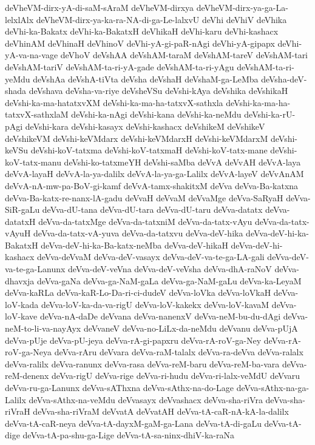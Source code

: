 {deVheVM-dirx-yA-di-saM-sAraM
deVheVM-dirxya
deVheVM-dirx-ya-ga-La-lelxlAlx
deVheVM-dirx-ya-ka-ra-NA-di-ga-Le-lalxvU
deVhi
deVhiV
deVhika
deVhi-ka-Bakatx
deVhi-ka-BakatxH
deVhikaH
deVhi-karu
deVhi-kashacx
deVhinAM
deVhinaH
deVhinoV
deVhi-yA-gi-paR-nAgi
deVhi-yA-gipapx
deVhi-yA-va-na-vage
deVhoV
deVshAA
deVshAM-taraM
deVshAM-tareV
deVshAM-tari
deVshAM-tariV
deVshAM-ta-ri-yA-gade
deVshAM-ta-ri-yAgu
deVshAM-ta-ri-yeMdu
deVshAa
deVshA-tiVta
deVsha
deVshaH
deVshaM-ga-LeMba
deVsha-deV-shada
deVshava
deVsha-va-riye
deVsheVSu
deVshi-kAya
deVshika
deVshikaH
deVshi-ka-ma-hatatxvXM
deVshi-ka-ma-ha-tatxvX-sathxla
deVshi-ka-ma-ha-tatxvX-sathxlaM
deVshi-ka-nAgi
deVshi-kana
deVshi-ka-neMdu
deVshi-ka-rU-pAgi
deVshi-kara
deVshi-kasayx
deVshi-kashacx
deVshikeM
deVshikeV
deVshikeVM
deVshi-keVMdarx
deVshi-keVMdarxH
deVshi-keVMdarxM
deVshi-keVSu
deVshi-koV-tatxma
deVshi-koV-tatxmaH
deVshi-koV-tatx-mane
deVshi-koV-tatx-manu
deVshi-ko-tatxmeYH
deVshi-saMba
deVvA
deVvAH
deVvA-laya
deVvA-layaH
deVvA-la-ya-dalilx
deVvA-la-ya-ga-Lalilx
deVvA-layeV
deVvAnAM
deVvA-nA-mw-pa-BoV-gi-kamf
deVvA-tamx-shakitxM
deVva
deVva-Ba-katxna
deVva-Ba-katx-re-nanx-lA-gadu
deVvaH
deVvaM
deVvaMge
deVva-SaRyaH
deVva-SiR-gaLu
deVva-dU-tana
deVva-dU-tara
deVva-dU-taru
deVva-datatx
deVva-datatxH
deVva-da-tatxMge
deVva-da-tatxniM
deVva-da-tatx-vAyu
deVva-da-tatx-vAyuH
deVva-da-tatx-vA-yuva
deVva-da-tatxvu
deVva-deV-hika
deVva-deV-hi-ka-BakatxH
deVva-deV-hi-ka-Ba-katx-neMba
deVva-deV-hikaH
deVva-deV-hi-kashacx
deVva-deVvaM
deVva-deV-vasayx
deVva-deV-va-te-ga-LA-gali
deVva-deV-va-te-ga-Lanunx
deVva-deV-veVna
deVva-deV-veVsha
deVva-dhA-raNoV
deVva-dhavxja
deVva-gaNa
deVva-ga-NaM-gaLa
deVva-ga-NaM-gaLu
deVva-ka-LeyaM
deVva-kaRLa
deVva-kaR-Lo-Da-ri-ci-dudeV
deVva-loVka
deVva-loVkaH
deVva-loV-kada
deVva-loV-ka-da-va-rigU
deVva-loV-kakekx
deVva-loV-kavaM
deVva-loV-kave
deVva-nA-daDe
deVvana
deVva-nanenxV
deVva-neM-bu-du-dAgi
deVva-neM-to-li-va-nayAyx
deVvaneV
deVva-no-LiLx-da-neMdu
deVvanu
deVva-pUjA
deVva-pUje
deVva-pU-jeya
deVva-rA-gi-papxru
deVva-rA-roV-ga-Ney
deVva-rA-roV-ga-Neya
deVva-rAru
deVvara
deVva-raM-talalx
deVva-ra-deVva
deVva-ralalx
deVva-ralilx
deVva-ranunx
deVva-rasa
deVva-reM-baru
deVva-reM-ba-vara
deVva-reM-denenx
deVva-rigU
deVva-rige
deVva-ri-hudu
deVva-ri-lalx-veMdU
deVvaru
deVva-ru-ga-Lanunx
deVva-sAThxna
deVva-sAthx-na-do-Lage
deVva-sAthx-na-ga-Lalilx
deVva-sAthx-na-veMdu
deVvasayx
deVvashacx
deVva-sha-riVra
deVva-sha-riVraH
deVva-sha-riVraM
deVvatA
deVvatAH
deVva-tA-caR-nA-kA-la-dalilx
deVva-tA-caR-neya
deVva-tA-dayxM-gaM-ga-Lana
deVva-tA-di-gaLu
deVva-tA-dige
deVva-tA-pa-shu-ga-Lige
deVva-tA-sa-ninx-dhiV-ka-raNa
}
